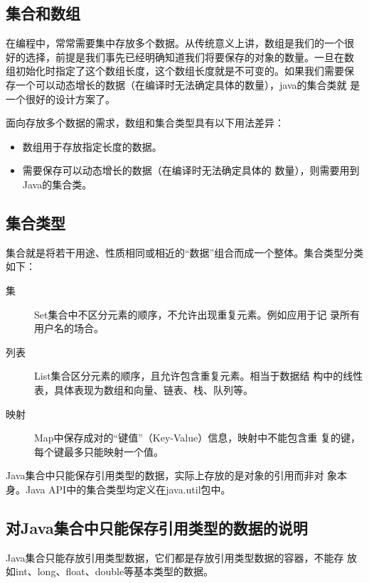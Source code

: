 \subsection{集合和数组}


在编程中，常常需要集中存放多个数据。从传统意义上讲，数组是我们的一个很
好的选择，前提是我们事先已经明确知道我们将要保存的对象的数量。一旦在数
组初始化时指定了这个数组长度，这个数组长度就是不可变的。如果我们需要保
存一个可以动态增长的数据（在编译时无法确定具体的数量），java的集合类就
是一个很好的设计方案了。

面向存放多个数据的需求，数组和集合类型具有以下用法差异：
  
\begin{itemize}
\item 数组用于存放指定长度的数据。
\item 需要保存可以动态增长的数据（在编译时无法确定具体的
  数量），则需要用到Java的集合类。
\end{itemize}

\subsection{集合类型}

{\hei\Red 集合就是将若干用途、性质相同或相近的“数据”组合而成一个整体。}集合类型分类如下：

\begin{description}
\item[集] Set集合中不区分元素的顺序，不允许出现重复元素。例如应用于记
  录所有用户名的场合。
\item[列表] List集合区分元素的顺序，且允许包含重复元素。相当于数据结
  构中的线性表，具体表现为数组和向量、链表、栈、队列等。
\item[映射] Map中保存成对的“键值”（Key-Value）信息，映射中不能包含重
  复的键，每个键最多只能映射一个值。
\end{description}


  
{\kai Java集合中只能保存引用类型的数据，实际上存放的是对象的引用而非对
  象本身。Java API中的集合类型均定义在java.util包中。}

\subsection{对Java集合中只能保存引用类型的数据的说明}

Java集合只能存放引用类型数据，它们都是存放引用类型数据的容器，不能存
放如int、long、float、double等基本类型的数据。


